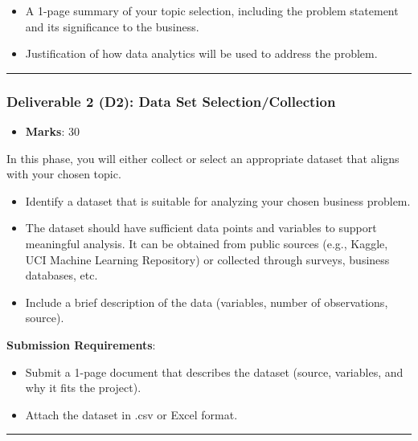 \documentclass[
]{article}
\providecommand{\tightlist}{%
  \setlength{\itemsep}{0pt}\setlength{\parskip}{0pt}}
\begin{document}
\begin{itemize}
\tightlist
\item
  A 1-page summary of your topic selection, including the problem
  statement and its significance to the business.
\item
  Justification of how data analytics will be used to address the
  problem.
\end{itemize}

\begin{center}\rule{0.5\linewidth}{0.5pt}\end{center}

\subsubsection{\texorpdfstring{\textbf{Deliverable 2 (D2): Data Set
Selection/Collection}}{Deliverable 2 (D2): Data Set Selection/Collection}}\label{deliverable-2-d2-data-set-selectioncollection}

\begin{itemize}
\tightlist
\item
  \textbf{Marks}: 30
\end{itemize}

In this phase, you will either collect or select an appropriate dataset
that aligns with your chosen topic.

\begin{itemize}
\tightlist
\item
  Identify a dataset that is suitable for analyzing your chosen business
  problem.
\item
  The dataset should have sufficient data points and variables to
  support meaningful analysis. It can be obtained from public sources
  (e.g., Kaggle, UCI Machine Learning Repository) or collected through
  surveys, business databases, etc.
\item
  Include a brief description of the data (variables, number of
  observations, source).
\end{itemize}

\textbf{Submission Requirements}:

\begin{itemize}
\tightlist
\item
  Submit a 1-page document that describes the dataset (source,
  variables, and why it fits the project).
\item
  Attach the dataset in .csv or Excel format.
\end{itemize}

\begin{center}\rule{0.5\linewidth}{0.5pt}\end{center}
\end{document}
